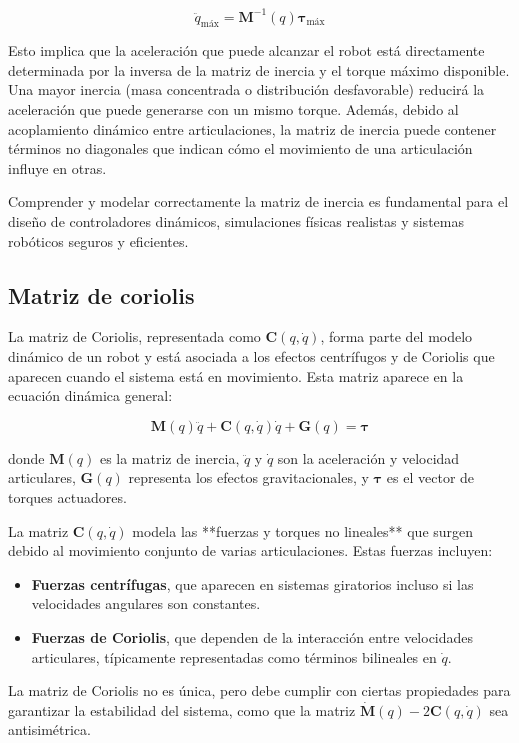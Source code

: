 \[
\ddot{q}_{\text{máx}} = \mathbf{M}^{-1}(q) \boldsymbol{\tau}_{\text{máx}}
\]

Esto implica que la aceleración que puede alcanzar el robot está directamente determinada por la inversa de la matriz de inercia y el torque máximo disponible. Una mayor inercia (masa concentrada o distribución desfavorable) reducirá la aceleración que puede generarse con un mismo torque. Además, debido al acoplamiento dinámico entre articulaciones, la matriz de inercia puede contener términos no diagonales que indican cómo el movimiento de una articulación influye en otras.

Comprender y modelar correctamente la matriz de inercia es fundamental para el diseño de controladores dinámicos, simulaciones físicas realistas y sistemas robóticos seguros y eficientes.


\subsection{Matriz de coriolis}

La matriz de Coriolis, representada como $\mathbf{C}(q, \dot{q})$, forma parte del modelo dinámico de un robot y está asociada a los efectos centrífugos y de Coriolis que aparecen cuando el sistema está en movimiento. Esta matriz aparece en la ecuación dinámica general:

\[
\mathbf{M}(q)\ddot{q} + \mathbf{C}(q, \dot{q})\dot{q} + \mathbf{G}(q) = \boldsymbol{\tau}
\]

donde $\mathbf{M}(q)$ es la matriz de inercia, $\ddot{q}$ y $\dot{q}$ son la aceleración y velocidad articulares, $\mathbf{G}(q)$ representa los efectos gravitacionales, y $\boldsymbol{\tau}$ es el vector de torques actuadores.

La matriz $\mathbf{C}(q, \dot{q})$ modela las **fuerzas y torques no lineales** que surgen debido al movimiento conjunto de varias articulaciones. Estas fuerzas incluyen:
\begin{itemize}
	\item \textbf{Fuerzas centrífugas}, que aparecen en sistemas giratorios incluso si las velocidades angulares son constantes.
	\item \textbf{Fuerzas de Coriolis}, que dependen de la interacción entre velocidades articulares, típicamente representadas como términos bilineales en $\dot{q}$.
\end{itemize}

La matriz de Coriolis no es única, pero debe cumplir con ciertas propiedades para garantizar la estabilidad del sistema, como que la matriz $\dot{\mathbf{M}}(q) - 2\mathbf{C}(q, \dot{q})$ sea antisimétrica.

